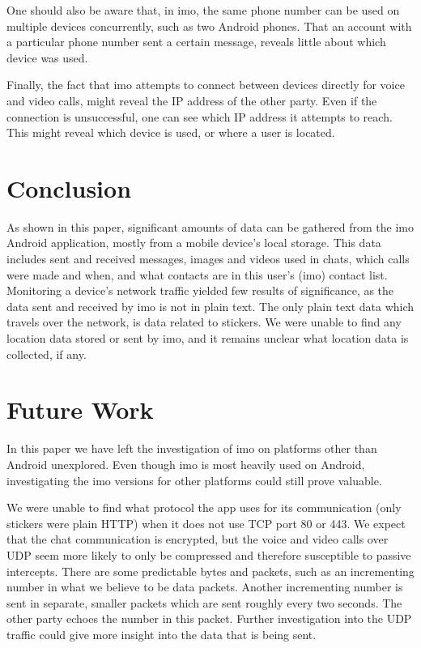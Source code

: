 \documentclass[conference]{IEEEtran}
\begin{document}
One should also be aware that, in imo, the same phone number can be used on
multiple devices concurrently, such as two Android phones. That an account with
a particular phone number sent a certain message, reveals little about which
device was used.

Finally, the fact that imo attempts to connect between devices directly for
voice and video calls, might reveal the IP address of the other party. Even if
the connection is unsuccessful, one can see which IP address it attempts to
reach. This might reveal which device is used, or where a user is located.


\section{Conclusion}\label{sec:conc}

As shown in this paper, significant amounts of data can be gathered from the
imo Android application, mostly from a mobile device's local storage. This data
includes sent and received messages, images and videos used in chats, which
calls were made and when, and what contacts are in this user's (imo) contact
list. Monitoring a device's network traffic yielded few results of
significance, as the data sent and received by imo is not in plain text. The
only plain text data which travels over the network, is data related to
stickers. We were unable to find any location data stored or sent by imo, and
it remains unclear what location data is collected, if any.


\section{Future Work}\label{sec:futwork}

In this paper we have left the investigation of imo on platforms other than
Android unexplored. Even though imo is most heavily used on Android,
investigating the imo versions for other platforms could still prove valuable.

We were unable to find what protocol the app uses for its communication (only
stickers were plain HTTP) when it does not use TCP port 80 or 443. We expect
that the chat communication is encrypted, but the voice and video calls over
UDP seem more likely to only be compressed and therefore susceptible to passive
intercepts. There are some predictable bytes and packets, such as an
incrementing number in what we believe to be data packets. Another incrementing
number is sent in separate, smaller packets which are sent roughly every two
seconds. The other party echoes the number in this packet. Further
investigation into the UDP traffic could give more insight into the data that
is being sent.
\end{document}
